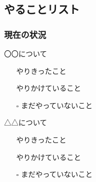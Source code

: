 \documentclass[dvipdfmx,12pt,aspectratio=169]{beamer}
\newcommand{\notyet}{$\square$}
\newcommand{\done}{\rlap{\raisebox{0.3ex}{\hspace{0.4ex}\small \ding{52}}}{$\square$}}
\newcommand{\partly}{\rlap{\raisebox{0.3ex}{\hspace{0.4ex}\tiny \ding{52}}}{$\square$}}
\begin{document}
\subsection{やることリスト}
\begin{frame}\frametitle{現在の状況}
\begin{block}{〇〇について}
\begin{itemize}
    \item[\done] やりきったこと
    \item[\partly] やりかけていること
    \item[\notyet] まだやっていないこと
\end{itemize}
\end{block}
\begin{block}{△△について}
\begin{itemize}
    \item[\done] やりきったこと
    \item[\partly] やりかけていること
    \item[\notyet] まだやっていないこと
\end{itemize}
\end{block}
\end{frame}
\end{document}
